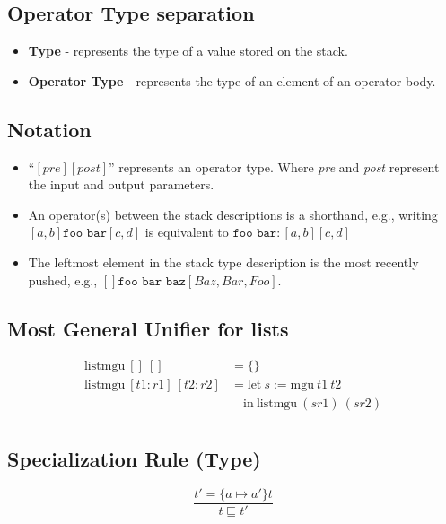 \documentclass{article}
\newcommand{\op}[3]{[#1] \texttt{#2} [#3]}
\begin{document}
\subsection*{Operator Type separation}
\begin{itemize}
\item \textbf{Type} - represents the type of a value stored on the stack.
\item \textbf{Operator Type} - represents the type of an element of an operator body.
\end{itemize}

\subsection*{Notation}

\begin{itemize}
\item ``$\op{\textit{pre}}{}{\textit{post}}$'' represents an operator
  type. Where \textit{pre} and \textit{post} represent the input and output
  parameters.
\item An operator(s) between the stack descriptions is a shorthand,
  e.g., writing $\op{a, b}{foo bar}{c, d}$ is equivalent to
  $\texttt{foo bar} : \op{a, b}{}{c, d}$
\item The leftmost element in the stack type description is the most
  recently pushed, e.g., $\op{}{foo bar baz}{Baz, Bar, Foo}$.
\end{itemize}

\subsection*{Most General Unifier for lists}
\begin{equation*}
  \begin{array}{ll}
    \text{listmgu} \: [] \: [] & = \{ \} \\
    \text{listmgu} \: [t1:r1] \: [t2:r2] & =
      \text{let} \: s := \text{mgu} \: t1 \: t2 \\
      \: & \quad \text{in} \: \text{listmgu} \: (s r1) \: (s r2) \\
  \end{array}
\end{equation*}

\subsection*{Specialization Rule (Type)}
\begin{equation*}
  \tag{Type spec}
  \frac{
    t' = \{ a \mapsto a' \} t
  }{
    t \sqsubseteq t'
  }
\end{equation*}
\end{document}
